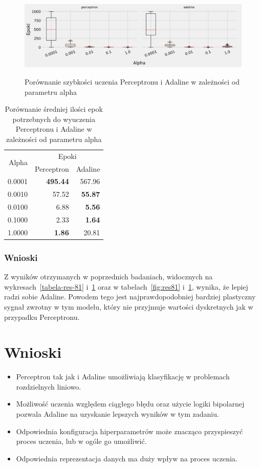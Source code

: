 \documentclass{article}
\begin{document}
\begin{figure}[!h]
	\centering
	\caption{Porównanie szybkości uczenia Perceptronu i Adaline w zależności od parametru alpha}
	\includegraphics[width=\textwidth]{ada_per_alpha.png}
	\label{fig:res82}
\end{figure}

\begin{table}[!h]
	\caption{Porównanie średniej ilości epok potrzebnych do wyuczenia Perceptronu i Adaline w zależności od parametru alpha}
	\label{tabela-res-82}
	\centering
	\begin{tabular}{rrr}
		\toprule
		\multirow{2}{*}{Alpha}   & \multicolumn{2}{c}{Epoki} \\
		       & Perceptron      & Adaline        \\
		\midrule
		0.0001 & \textbf{495.44} & 567.96         \\
		0.0010 & 57.52           & \textbf{55.87} \\
		0.0100 & 6.88            & \textbf{5.56}  \\
		0.1000 & 2.33            & \textbf{1.64}  \\
		1.0000 & \textbf{1.86}   & 20.81          \\
		\bottomrule
	\end{tabular}
\end{table}

\subsubsection*{Wnioski}

Z wyników otrzymanych w poprzednich badaniach, widocznych na wykresach~\ref{tabela-res-81} i~\ref{tabela-res-82} oraz w tabelach~\ref{fig:res81} i~\ref{fig:res82}, wynika, że lepiej radzi sobie Adaline. Powodem tego jest najprawdopodobniej bardziej plastyczny sygnał zwrotny w tym modelu, który nie przyjmuje wartości dyskretnych jak w przypadku Perceptronu.

\newpage
\section{Wnioski}

\begin{itemize}
	\item Perceptron tak jak i Adaline umożliwiają klasyfikację w problemach rozdzielnych liniowo.
	\item Możliwość uczenia względem ciągłego błędu oraz użycie logiki bipolarnej pozwala Adaline na uzyskanie lepszych wyników w tym zadaniu.
	\item Odpowiednia konfiguracja hiperparametrów może znacząco przyspieszyć proces uczenia, lub w ogóle go umożliwić.
	\item Odpowiednia reprezentacja danych ma duży wpływ na proces uczenia.
\end{itemize}
\end{document}
